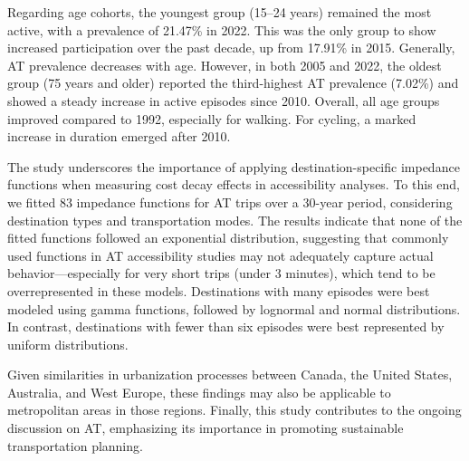 \documentclass[preprint, 3p,
authoryear]{elsarticle} %
\begin{document}
Regarding age cohorts, the youngest group (15--24 years) remained the
most active, with a prevalence of 21.47\% in 2022. This was the only
group to show increased participation over the past decade, up from
17.91\% in 2015. Generally, AT prevalence decreases with age. However,
in both 2005 and 2022, the oldest group (75 years and older) reported
the third-highest AT prevalence (7.02\%) and showed a steady increase in
active episodes since 2010. Overall, all age groups improved compared to
1992, especially for walking. For cycling, a marked increase in duration
emerged after 2010.

The study underscores the importance of applying destination-specific
impedance functions when measuring cost decay effects in accessibility
analyses. To this end, we fitted 83 impedance functions for AT trips
over a 30-year period, considering destination types and transportation
modes. The results indicate that none of the fitted functions followed
an exponential distribution, suggesting that commonly used functions in
AT accessibility studies may not adequately capture actual
behavior---especially for very short trips (under 3 minutes), which tend
to be overrepresented in these models. Destinations with many episodes
were best modeled using gamma functions, followed by lognormal and
normal distributions. In contrast, destinations with fewer than six
episodes were best represented by uniform distributions.

Given similarities in urbanization processes between Canada, the United
States, Australia, and West Europe, these findings may also be
applicable to metropolitan areas in those regions. Finally, this study
contributes to the ongoing discussion on AT, emphasizing its importance
in promoting sustainable transportation planning.

\renewcommand\refname{References}

\end{document}
